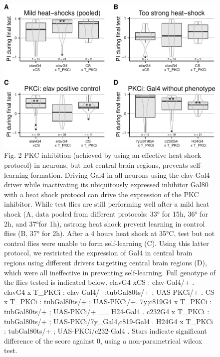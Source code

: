 \documentclass[]{article}
\begin{document}
\begin{figure}[htbp]
\centering
\includegraphics{firsttest_files/figure-latex/unnamed-chunk-3-1.pdf}
\caption{Fig. 2 PKC inhibition (achieved by using an effective heat
shock protocol) in neurons, but not central brain regions, prevents
self-learning formation. Driving Gal4 in all neurons using the elav-Gal4
driver while inactivating its ubiquitously expressed inhibitor Gal80
with a heat shock protocol can drive the expression of the PKC
inhibitor. While test flies are still performing well after a mild heat
shock (A, data pooled from different protocols: 33° for 15h, 36° for 2h,
and 37°for 1h), astrong heat shock prevent learning in control flies (B,
37° for 2h). After a 4 hours heat shock at 35°C, test but not control
flies were unable to form self-learning (C). Using this latter protocol,
we restricted the expression of Gal4 in central brain regions using
different drivers targetting central brain regions (D), which were all
ineffective in preventing self-learning. Full genotype of the flies
tested is indicated below. elavG4 xCS : elav-Gal4/+ . elavG4 x T\_PKCi :
elav-Gal4/+;tubGal80ts/+ ; UAS-PKCi/+ . CS x T\_PKCi : tubGal80ts/+ ;
UAS-PKCi/+. 7y;c819G4 x T\_PKCi : tubGal80ts/+ ; UAS-PKCi/+ \_\_
H24-Gal4 . c232G4 x T\_PKCi : tubGal80ts/+ ; UAS-PKCi/7y\_Gal4,c819-Gal4
. H24G4 x T\_PKCi : tubGal80ts/+ ; UAS-PKCi/c232-Gal4 . Stars indicate
significant difference of the score against 0, using a non-parametrical
wilcox test.}
\end{figure}
\end{document}
